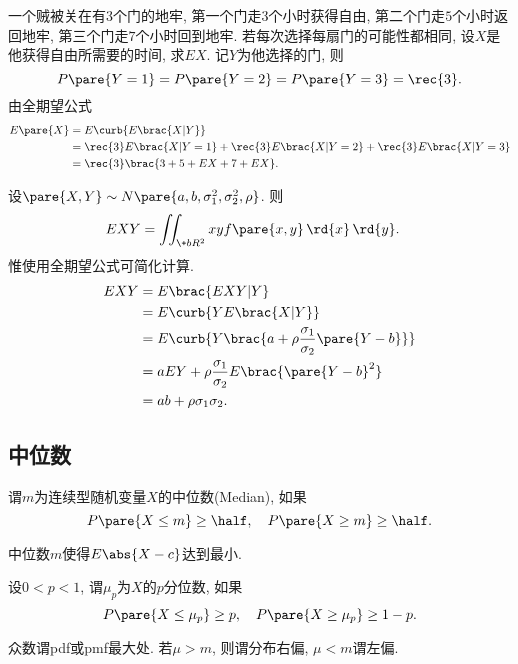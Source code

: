 \documentclass{ctexart}
\begin{document}
\begin{sample}
    \begin{ex}
        一个贼被关在有$3$个门的地牢, 第一个门走$3$个小时获得自由, 第二个门走$5$个小时返回地牢, 第三个门走$7$个小时回到地牢. 若{\color{red}每次选择每扇门的可能性都相同}, 设$X$是他获得自由所需要的时间, 求$EX$. 记$Y$为他选择的门, 则
        \[ P\pare{Y = 1} = P\pare{Y = 2} = P\pare{Y = 3} = \rec{3}. \]
        由全期望公式
        \begin{align*}
            E\pare{X} &= E\curb{E\brac{X\vert Y}} \\
            &= \rec{3} E\brac{X\vert Y = 1} + \rec{3} E\brac{X\vert Y = 2} + \rec{3} E\brac{X\vert Y = 3} \\
            &= \rec{3}\brac{3 + 5 + EX + 7 + EX}.
        \end{align*}
    \end{ex}
\end{sample}
\begin{sample}
    \begin{ex}
        设$\pare{X,Y} \sim N\pare{a,b,\sigma_1^2,\sigma_2^2, \rho}$. 则
        \begin{align*}
            EXY &= \iint_{\+bR^2} xy f\pare{x,y}\,\rd{x}\,\rd{y}.
        \end{align*}
        惟使用全期望公式可简化计算.
        \begin{align*}
            EXY &= E\brac{EXY\vert Y} \\
            &= E\curb{Y E\brac{X\vert Y}} \\
            &= E\curb{Y\brac{a+\rho \frac{\sigma_1}{\sigma_2}\pare{Y-b}}} \\
            &= aEY + \rho \frac{\sigma_1}{\sigma_2}E\brac{\pare{Y-b}^2} \\
            &= ab + \rho \sigma_1 \sigma_2.
        \end{align*}
    \end{ex}
\end{sample}



\subsection{中位数} %
\label{sub:中位数}

\begin{definition}
    谓$m$为连续型随机变量$X$的中位数(Median), 如果
    \[ P\pare{X\le m} \ge \half, \quad P\pare{X\ge m} \ge \half. \]
\end{definition}
\begin{sample}
    \begin{ex}
        中位数$m$使得$E\abs{X-c}$达到最小.
    \end{ex}
\end{sample}
设$0<p<1$, 谓$\mu_p$为$X$的$p$分位数, 如果
\[ P\pare{X\le \mu_p} \ge p,\quad P\pare{X\ge \mu_p} \ge 1-p. \]
\par
众数谓pdf或pmf最大处. 若$\mu>m$, 则谓分布右偏, $\mu < m$谓左偏.
\end{document}
